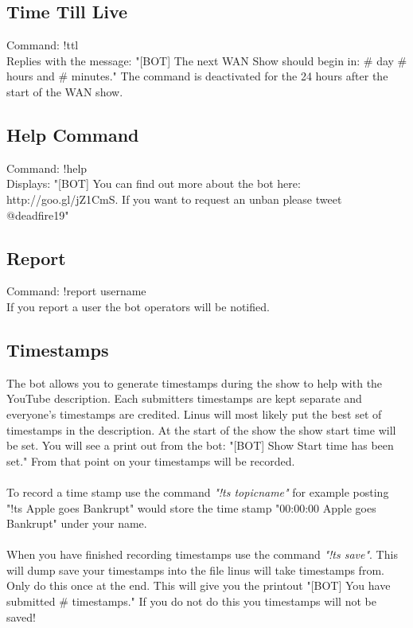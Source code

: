 \documentclass[10pt]{article}
\begin{document}
\subsection{Time Till Live}
Command: !ttl\\
Replies with the message: "[BOT] The next WAN Show should begin in: \# day \# hours and \# minutes."
The command is deactivated for the 24 hours after the start of the WAN show.
\subsection{Help Command}
Command: !help\\
Displays: "[BOT] You can find out more about the bot here: http://goo.gl/jZ1CmS. If you want to request an unban please tweet @deadfire19"
\subsection{Report}
Command: !report username\\
If you report a user the bot operators will be notified.
\subsection{Timestamps}
The bot allows you to generate timestamps during the show to help with the YouTube description. Each submitters timestamps are kept separate and everyone's timestamps are credited. Linus will most likely put the best set of timestamps in the description. At the start of the show the show start time will be set. You will see a print out from the bot: "[BOT] Show Start time has been set." From that point on your timestamps will be recorded.\\\\
 
To record a time stamp use the command \emph{"!ts topicname"} for example posting  "!ts Apple goes Bankrupt" would store the time stamp "00:00:00 Apple goes Bankrupt" under your name.
 \\\\
When you have finished recording timestamps use the command \emph{"!ts save"}. This will dump save your timestamps into the file linus will take timestamps from. Only do this once at the end. This will give you the printout "[BOT] You have submitted \# timestamps." If you do not do this you timestamps will not be saved!
\end{document}
